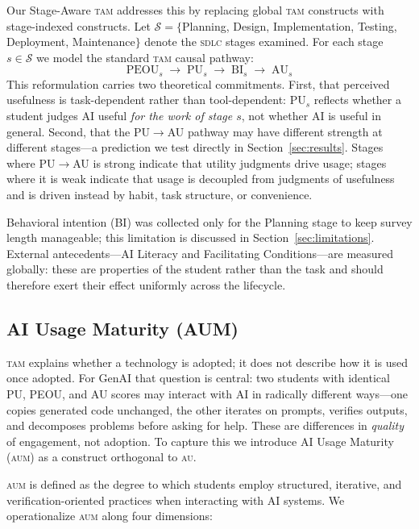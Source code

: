 \documentclass[sigconf,anonymous]{acmart}
\newcommand{\AUM}{\textsc{aum}\xspace}
\newcommand{\AU}{\textsc{au}\xspace}
\newcommand{\TAM}{\textsc{tam}\xspace}
\newcommand{\SDLC}{\textsc{sdlc}\xspace}
\newcommand{\GenAI}{GenAI\xspace}
\begin{document}
Our Stage-Aware \TAM addresses this by replacing global \TAM
constructs with stage-indexed constructs. Let $\mathcal{S} = \{$Planning,
Design, Implementation, Testing, Deployment, Maintenance$\}$ denote
the \SDLC stages examined. For each stage $s \in \mathcal{S}$ we
model the standard \TAM causal pathway:
\[
  \text{PEOU}_s \;\rightarrow\; \text{PU}_s \;\rightarrow\;
  \text{BI}_s \;\rightarrow\; \text{AU}_s
\]
This reformulation carries two theoretical commitments. First, that
perceived usefulness is task-dependent rather than tool-dependent:
PU$_s$ reflects whether a student judges AI useful \emph{for the work
of stage $s$}, not whether AI is useful in general. Second, that the
PU$\rightarrow$AU pathway may have different strength at different
stages---a prediction we test directly in Section~\ref{sec:results}.
Stages where PU$\rightarrow$AU is strong indicate that utility
judgments drive usage; stages where it is weak indicate that usage
is decoupled from judgments of usefulness and is driven instead by
habit, task structure, or convenience.

Behavioral intention (BI) was collected only for the Planning stage
to keep survey length manageable; this limitation is discussed in
Section~\ref{sec:limitations}. External antecedents---AI Literacy and
Facilitating Conditions---are measured globally: these are properties
of the student rather than the task and should therefore exert their
effect uniformly across the lifecycle.

\subsection{AI Usage Maturity (AUM)}
\TAM explains whether a technology is adopted; it does not describe
how it is used once adopted. For \GenAI that question is central: two
students with identical PU, PEOU, and AU scores may interact with AI
in radically different ways---one copies generated code unchanged,
the other iterates on prompts, verifies outputs, and decomposes
problems before asking for help. These are differences in
\emph{quality} of engagement, not adoption. To capture this we
introduce AI Usage Maturity (\AUM) as a construct orthogonal to \AU.

\AUM is defined as the degree to which students employ structured,
iterative, and verification-oriented practices when interacting with
AI systems. We operationalize \AUM along four dimensions:
\end{document}
